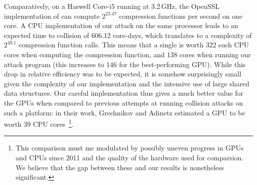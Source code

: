Comparatively, on a Haswell Core-i5 running at 3.2\,GHz, the OpenSSL implementation of \shaone
can compute $2^{23.47}$ compression functions per second on one core. A CPU implementation of our attack
on the same processor leads to an expected time to collision of 606.12 core-days, which translates to a complexity of $2^{49.1}$
compression function calls.
This means that a single \gtx is worth 322 such CPU cores when computing the \shaone compression function, and 138 cores when
running our attack program (this increases to 146 for the best-performing GPU).
While this drop in relative efficiency was to be expected, it is somehow surprisingly small given the
complexity of our implementation and \eg the intensive use of large shared data structures. Our careful implementation thus
gives a much better value for the GPUs when compared to previous attempts at running collision attacks on such a platform:
in their work, Grechnikov and Adinetz estimated a GPU to be worth 39 CPU cores~\cite{cryptoeprint:2011:641}\footnote{This comparison must me modulated by possibly uneven progress in GPUs and CPUs
since 2011 and the quality of the hardware used for comparsion. We believe that the gap between these and our results is nonetheless significant.}.
